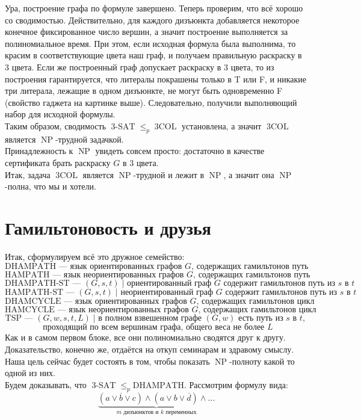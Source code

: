 \documentclass[11pt]{article}
\DeclareMathOperator{\tSAT}{3-SAT}
\DeclareMathOperator{\trCOL}{3COL}
\DeclareMathOperator{\NP}{NP}
\begin{document}
Ура, построение графа по формуле завершено. Теперь проверим, что всё хорошо со сводимостью. Действительно, для каждого дизъюнкта добавляется некоторое конечное фиксированное число вершин, а значит построение выполняется за полиномиальное время.
    При этом, если исходная формула была выполнима, то красим в соответствующие цвета наш граф, и получаем правильную раскраску в $3$ цвета. Если же построенный граф допускает раскраску в $3$ цвета, то из построения гарантируется, что литералы покрашены только в T или F, и никакие три литерала, лежащие в одном дизъюнкте, не могут быть одновременно F (свойство гаджета на картинке выше). Следовательно, получили выполняющий набор для исходной формулы. \\
    Таким образом, сводимость $\tSAT \leq_{p} \trCOL$ установлена, а значит $\trCOL$ является $\NP$-трудной задачкой. \\ 
    Принадлежность к $\NP$ увидеть совсем просто: достаточно в качестве сертификата брать раскраску $G$ в $3$ цвета. \\
    Итак, задача $\trCOL$ является $\NP$-трудной и лежит в $\NP$, а значит она $\NP$-полна, что мы и хотели.

\section{Гамильтоновость и друзья}

Итак, сформулируем всё это дружное семейство:
\[\text{DHAMPATH --- язык ориентированных графов } G \text{, содержащих гамильтонов путь}\]
\[\text{HAMPATH --- язык неориентированных графов } G \text{, содержащих гамильтонов путь}\]
\[\text{DHAMPATH-ST --- } (G, s, t) \; | \text{ ориентированный граф } G \text{ содержит гамильтонов путь из } s \text{ в } t\]
\[\text{HAMPATH-ST --- } (G, s, t) \; | \text{ неориентированный граф } G \text{ содержит гамильтонов путь из } s \text{ в } t\]
\[\text{DHAMCYCLE --- язык ориентированных графов } G \text{, содержащих гамильтонов цикл}\]
\[\text{HAMCYCLE --- язык неориентированных графов } G \text{, содержащих гамильтонов цикл}\]
\[\text{TSP --- } (G, w, s, t, L) \; | \text{ в полном взвешенном графе } (G, w) \text{ есть путь из } s \text{ в } t \text{, }\]
\[\text{ проходящий по всем вершинам графа, общего веса не более } L\]
Как и в самом первом блоке, все они полиномиально сводятся друг к другу. Доказательство, конечно же, отдаётся на откуп семинарам и здравому смыслу. Наша цель сейчас будет состоять в том, чтобы показать $\NP$-полноту какой то одной из них. \\
Будем доказывать, что $\tSAT \leq_{p} \text{DHAMPATH}$. Рассмотрим формулу вида:
\[\underbrace{(a \lor \overline{b} \lor c) \land (a \lor b \lor \overline{d}) \land \ldots}_{m \text{ дизъюнктов и } k \text{ переменных}}\]
\end{document}

